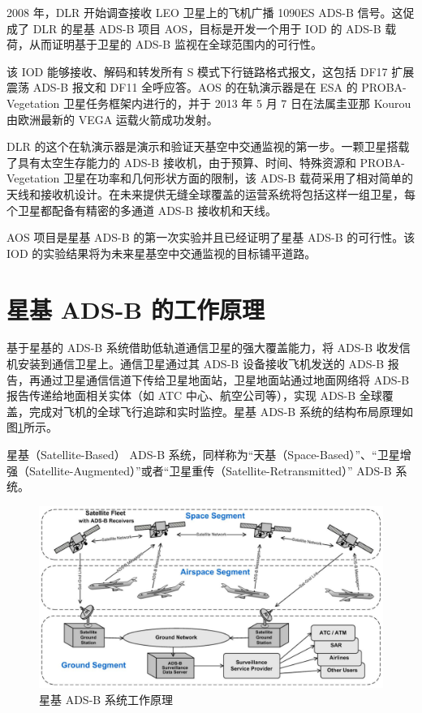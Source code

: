 2008 年，\acs{DLR} 开始调查接收 \acs{LEO} 卫星上的飞机广播 1090ES ADS-B 信号。这促成了 DLR 的星基 ADS-B 项目 \acs{AOS}，目标是开发一个用于 \acs{IOD} 的 ADS-B 载荷，从而证明基于卫星的 ADS-B 监视在全球范围内的可行性。

该 IOD 能够接收、解码和转发所有 S 模式下行链路格式报文，这包括 \acs{DF}17 扩展震荡 ADS-B 报文和 DF11 全呼应答。AOS 的在轨演示器是在 \acs{ESA} 的 PROBA-Vegetation 卫星任务框架内进行的，并于 2013 年 5 月 7 日在法属圭亚那 Kourou 由欧洲最新的 VEGA 运载火箭成功发射。

DLR 的这个在轨演示器是演示和验证天基空中交通监视的第一步。一颗卫星搭载了具有太空生存能力的 ADS-B 接收机，由于预算、时间、特殊资源和 PROBA-Vegetation 卫星在功率和几何形状方面的限制，该 ADS-B 载荷采用了相对简单的天线和接收机设计。在未来提供无缝全球覆盖的运营系统将包括这样一组卫星，每个卫星都配备有精密的多通道 ADS-B 接收机和天线。

AOS 项目是星基 ADS-B 的第一次实验并且已经证明了星基 ADS-B 的可行性。该 IOD 的实验结果将为未来星基空中交通监视的目标铺平道路。

\section{星基 ADS-B 的工作原理}

基于星基的 ADS-B 系统借助低轨道通信卫星的强大覆盖能力，将 ADS-B 收发信机安装到通信卫星上。通信卫星通过其 ADS-B 设备接收飞机发送的 ADS-B 报告，再通过卫星通信信道下传给卫星地面站，卫星地面站通过地面网络将 ADS-B 报告传递给地面相关实体（如 ATC 中心、航空公司等），实现 ADS-B 全球覆盖，完成对飞机的全球飞行追踪和实时监控。星基 ADS-B 系统的结构布局原理如图\ref{fig:satellite_ads-b_arichitecture}所示。

星基（Satellite-Based） ADS-B 系统，同样称为“天基（Space-Based）”、“卫星增强（Satellite-Augmented）”或者“卫星重传（Satellite-Retransmitted）” ADS-B 系统。

\begin{figure}[!htb]
\centering
\includegraphics[width=15cm]{pic/satellite_ads-b_arichitecture.png}
\caption{星基 ADS-B 系统工作原理\protect\footnotemark}
\label{fig:satellite_ads-b_arichitecture}
\end{figure}

